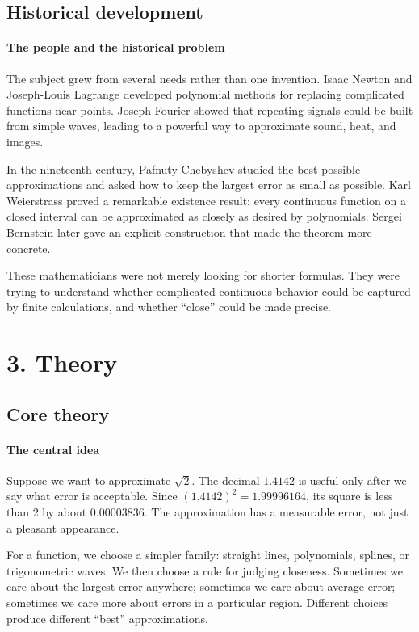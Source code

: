 \subsection*{Historical development}
\begin{historylist}
\paragraph{The people and the historical problem}
The subject grew from several needs rather than one invention. Isaac Newton and Joseph-Louis Lagrange developed polynomial methods for replacing complicated functions near points. Joseph Fourier showed that repeating signals could be built from simple waves, leading to a powerful way to approximate sound, heat, and images.

In the nineteenth century, Pafnuty Chebyshev studied the best possible approximations and asked how to keep the largest error as small as possible. Karl Weierstrass proved a remarkable existence result: every continuous function on a closed interval can be approximated as closely as desired by polynomials. Sergei Bernstein later gave an explicit construction that made the theorem more concrete.

These mathematicians were not merely looking for shorter formulas. They were trying to understand whether complicated continuous behavior could be captured by finite calculations, and whether ``close'' could be made precise.

\end{historylist}
\section*{3. Theory}
\subsection*{Core theory}
\paragraph{The central idea}
Suppose we want to approximate $\sqrt{2}$. The decimal $1.4142$ is useful only after we say what error is acceptable. Since $(1.4142)^2=1.99996164$, its square is less than 2 by about $0.00003836$. The approximation has a measurable error, not just a pleasant appearance.

For a function, we choose a simpler family: straight lines, polynomials, splines, or trigonometric waves. We then choose a rule for judging closeness. Sometimes we care about the largest error anywhere; sometimes we care about average error; sometimes we care more about errors in a particular region. Different choices produce different ``best'' approximations.

